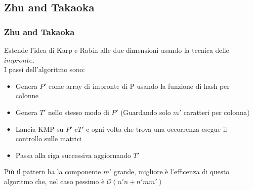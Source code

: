 \documentclass{beamer}
\newcommand{\bigO}{\ensuremath{\mathcal{O}}} %
\begin{document}
\subsection{Zhu and Takaoka}
\begin{frame}
\frametitle{Zhu and Takaoka}

Estende l'idea di Karp e Rabin alle due dimensioni usando la tecnica delle $impronte$.\\
I passi dell'algoritmo sono:
\begin{itemize}
\item Genera $P'$ come array di impronte di P usando la funzione di hash per colonne
\item Genera $T'$ nello stesso modo di $P'$ (Guardando solo $m'$ caratteri per colonna)
\item Lancia KMP su $P'$ e$T'$ e ogni volta che trova una occorrenza esegue il controllo sulle matrici
\item Passa alla riga successiva aggiornando $T'$
\end{itemize}

Più il pattern ha la componente $m'$ grande, migliore è l'efficenza di questo algoritmo che, nel caso pessimo è $\bigO{(n'n + n'mm')}$

\end{frame}
\end{document}

